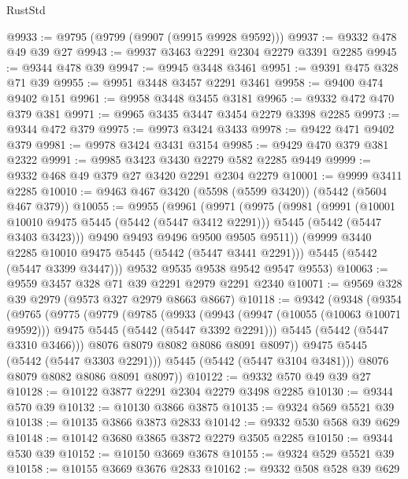 \begin{lexlean}{RustStd}
\begin{coremodule}
{\begin{coremodule}
{{{{{{{{{{{{@9933 := @9795 (@9799 (@9907 (@9915 @9928 @9592)))
@9937 := @9332 @478 @49 @39 @27
@9943 := @9937 @3463 @2291 @2304 @2279 @3391 @2285
@9945 := @9344 @478 @39
@9947 := @9945 @3448 @3461
@9951 := @9391 @475 @328 @71 @39
@9955 := @9951 @3448 @3457 @2291 @3461
@9958 := @9400 @474 @9402 @151
@9961 := @9958 @3448 @3455 @3181
@9965 := @9332 @472 @470 @379 @381
@9971 := @9965 @3435 @3447 @3454 @2279 @3398 @2285
@9973 := @9344 @472 @379
@9975 := @9973 @3424 @3433
@9978 := @9422 @471 @9402 @379
@9981 := @9978 @3424 @3431 @3154
@9985 := @9429 @470 @379 @381 @2322
@9991 := @9985 @3423 @3430 @2279 @582 @2285 @9449
@9999 := @9332 @468 @49 @379 @27 @3420 @2291 @2304 @2279
@10001 := @9999 @3411 @2285
@10010 := @9463 @467 @3420 (@5598 (@5599 @3420)) (@5442 (@5604 @467 @379))
@10055 := @9955
    (@9961
      (@9971
        (@9975
          (@9981
            (@9991
              (@10001 @10010 @9475 @5445 (@5442 (@5447 @3412 @2291)))
              @5445
              (@5442 (@5447 @3403 @3423)))
            @9490
            @9493
            @9496
            @9500
            @9505
            @9511))
        (@9999 @3440 @2285 @10010 @9475 @5445 (@5442 (@5447 @3441 @2291)))
        @5445
        (@5442 (@5447 @3399 @3447)))
      @9532
      @9535
      @9538
      @9542
      @9547
      @9553)
@10063 := @9559 @3457 @328 @71 @39 @2291 @2979 @2291 @2340
@10071 := @9569 @328 @39 @2979 (@9573 @327 @2979 @8663 @8667)
@10118 := @9342
    (@9348
      (@9354
        (@9765
          (@9775
            (@9779
              (@9785
                (@9933
                  (@9943
                    (@9947 (@10055 (@10063 @10071 @9592)))
                    @9475
                    @5445
                    (@5442 (@5447 @3392 @2291)))
                  @5445
                  (@5442 (@5447 @3310 @3466)))
                @8076
                @8079
                @8082
                @8086
                @8091
                @8097))
            @9475
            @5445
            (@5442 (@5447 @3303 @2291)))
          @5445
          (@5442 (@5447 @3104 @3481)))
        @8076
        @8079
        @8082
        @8086
        @8091
        @8097))
@10122 := @9332 @570 @49 @39 @27
@10128 := @10122 @3877 @2291 @2304 @2279 @3498 @2285
@10130 := @9344 @570 @39
@10132 := @10130 @3866 @3875
@10135 := @9324 @569 @5521 @39
@10138 := @10135 @3866 @3873 @2833
@10142 := @9332 @530 @568 @39 @629
@10148 := @10142 @3680 @3865 @3872 @2279 @3505 @2285
@10150 := @9344 @530 @39
@10152 := @10150 @3669 @3678
@10155 := @9324 @529 @5521 @39
@10158 := @10155 @3669 @3676 @2833
@10162 := @9332 @508 @528 @39 @629
}}}}}}}}}}}}
\end{coremodule}}
\end{coremodule}
\end{lexlean}
